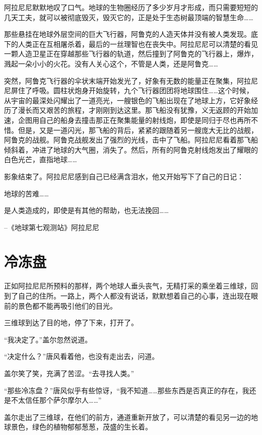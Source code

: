 阿拉尼尼默默地叹了口气。地球的生物圈经历了多少岁月才形成，而只需要短短的几天工夫，就可以被彻底毁灭，毁灭它的，正是处于生态树最顶端的智慧生命……

那些悬挂在地球外层空间的巨大飞行器，阿鲁克的人造天体并没有被人类发现。底下的人类正在互相屠杀着，最后的一丝理智也在丧失中。阿拉尼尼可以清楚的看见一颗人造卫星正在穿越那些飞行器的轨道，然后撞到了阿鲁克的飞行器上，爆炸，溅起一朵小小的火花。没有人关心这个，不管是人类，还是阿鲁克……

突然，阿鲁克飞行器的伞状末端开始发光了，好象有无数的能量正在聚集，阿拉尼尼屏住了呼吸。圆柱状炮身开始旋转，九个飞行器团团将地球围住……这个时候，从宇宙的最深处闪耀出了一道亮光，一艘银色的飞船出现在了地球上方，它好象经历了漫长而又艰苦的旅程，才刚刚到达这里。那飞船没有犹豫，义无返顾的开始加速，企图用自己的船身去撞击那正在聚集能量的射线炮，即使是同归于尽也再所不惜。但是，又是一道闪光，那飞船的背后，紧紧的跟随着另一艘庞大无比的战舰，阿鲁克的战舰。阿鲁克战舰发出了强烈的光线，击中了飞船。阿拉尼尼看着那飞船倾斜着，冲进了地球的大气圈，消失了。然后，所有的阿鲁克射线炮发出了耀眼的白色光芒，直指地球……

影象结束了。阿拉尼尼感到自己已经满含泪水，他又开始写下了自己的日记：

\begin{myquote}    
地球的苦难……

是人类造成的，即使是有其他的帮助，也无法挽回……
\end{myquote}

\begin{myflushright}
--《地球第七观测站》阿拉尼尼
\end{myflushright}

\chapter{冷冻盘}

正如阿拉尼尼所预料的那样，两个地球人垂头丧气，无精打采的乘坐着三维球，回到了自己的住所。一路上，两个人都没有说话，默默想着自己的心事，连出现在眼前的景色都不能再吸引他们的目光。

三维球到达了目的地，停了下来，打开了。

“我决定了。”盖尔忽然说道。

“决定什么？”唐风看着他，也没有走出去，问道。

盖尔笑了笑，充满了苦涩。“去寻找人类。”

“那些冷冻盘？”唐风似乎有些惊讶，“我不知道……那些东西是否真正的存在，我还是不太信任那个萨尔摩尔人……”

盖尔走出了三维球，在他们的前方，通道重新开放了，可以清楚的看见另一边的地球景色，绿色的植物郁郁葱葱，茂盛的生长着。

